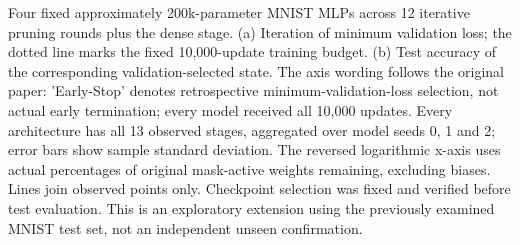 \caption{Four fixed approximately 200k-parameter MNIST MLPs across 12 iterative pruning rounds plus the dense stage. (a) Iteration of minimum validation loss; the dotted line marks the fixed 10,000-update training budget. (b) Test accuracy of the corresponding validation-selected state. The axis wording follows the original paper: 'Early-Stop' denotes retrospective minimum-validation-loss selection, not actual early termination; every model received all 10,000 updates. Every architecture has all 13 observed stages, aggregated over model seeds 0, 1 and 2; error bars show sample standard deviation. The reversed logarithmic x-axis uses actual percentages of original mask-active weights remaining, excluding biases. Lines join observed points only. Checkpoint selection was fixed and verified before test evaluation. This is an exploratory extension using the previously examined MNIST test set, not an independent unseen confirmation.}

